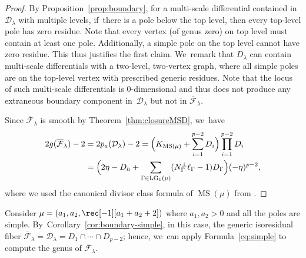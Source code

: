 \documentclass[JEP,XML,SOM,Unicode,NoFloatCountersInSection,published]{cedram}
\DeclareMathOperator\LG{LG}
\DeclareMathOperator\MS{MS}
\theoremstyle{definition}
\begin{document}
\begin{proof}
By Proposition~\ref{prop:boundary}, for a multi-scale differential contained in $\mathcal D_\lambda$ with multiple levels, if~there is a pole below the top level, then every top-level pole has zero residue. Note that every vertex (of genus zero) on top level must contain at least one pole. Additionally, a simple pole on the top level cannot have zero residue. This thus justifies the first claim. We~remark that $D_\lambda$ can contain multi-scale differentials with a two-level, two-vertex graph, where all simple poles are on the top-level vertex with prescribed generic residues. Note that the locus of such multi-scale differentials is $0$\nobreakdash-dimensional and thus does not produce any extraneous boundary component in~$\mathcal D_\lambda$ but not in $\overline{\mathcal F}_\lambda$.

Since $\overline{\mathcal F}_\lambda$ is smooth by Theorem~\ref{thm:closureMSD}, we~have\vspace*{-5pt}
\begin{equation}
\begin{aligned}
2g(\overline{\mathcal F}_\lambda) - 2 & = 2p_a (\mathcal D_\lambda) - 2  = \Bigl(K_{\MS(\mu)} + \sum_{i=1}^{p-2}D_i\Bigr) \prod_{i=1}^{p-2} D_i \\
& = \Bigl( 2\eta - D_h + \sum_{\Gamma\in \LG_1(\mu)} (N_{\Gamma}^{\bot} \ell_\Gamma - 1) D_\Gamma \Bigr)(-\eta)^{p-2},
\end{aligned}
\end{equation}
where we used the canonical divisor class formula of $\MS(\mu)$ from \cite[Th.\,1.1]{CMZ}.
\end{proof}

Consider $\mu = (a_1, a_2, \rec[-1][a_1+a_2+2])$ where $a_1, a_2 > 0$ and all the poles are simple. By~Corollary~\ref{cor:boundary-simple}, in this case, the generic isoresidual fiber $\overline{\mathcal F}_\lambda = \mathcal D_\lambda = D_1\cap \cdots \cap D_{p-2}$; hence, we~can apply Formula~\eqref{eq:simple} to compute the genus of $\overline{\mathcal F}_\lambda$.
\end{document}
